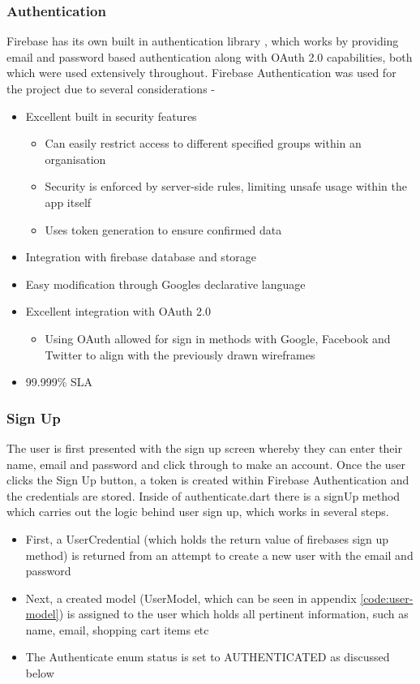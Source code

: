\documentclass[12pt]{article}
\begin{document}
	\subsubsection{Authentication}
	\label{authentication}
	Firebase has its own built in authentication library \cite{FirebaseAuthentication2021}, which works by providing email and password based authentication along with OAuth 2.0 capabilities, both which were used extensively throughout. Firebase Authentication was used for the project due to several considerations -
	\begin{itemize}
		\item Excellent built in security features
		\begin{itemize}
			\item Can easily restrict access to different specified groups within an organisation
			\item Security is enforced by server-side rules, limiting unsafe usage within the app itself
			\item Uses token generation to ensure confirmed data
		\end{itemize}
		\item Integration with firebase database and storage
		\item Easy modification through Googles declarative language
		\item Excellent integration with OAuth 2.0
		\begin{itemize}
			\item Using OAuth allowed for sign in methods with Google, Facebook and Twitter to align with the previously drawn wireframes
		\end{itemize}
		\item 99.999\% SLA
	\end{itemize}
	
	
	\subsubsection{Sign Up}
	The user is first presented with the sign up screen whereby they can enter their name, email and password and click through to make an account. Once the user clicks the Sign Up button, a token is created within Firebase Authentication and the credentials are stored. Inside of authenticate.dart there is a signUp method which carries out the logic behind user sign up, which works in several steps.
	\begin{itemize}
		\item First, a UserCredential (which holds the return value of firebases sign up method) is returned from an attempt to create a new user with the email and password
		\item Next, a created model (UserModel, which can be seen in appendix \ref{code:user-model}) is assigned to the user which holds all pertinent information, such as name, email, shopping cart items etc
		\item The Authenticate enum status is set to AUTHENTICATED as discussed below
	\end{itemize}
	
\end{document}
